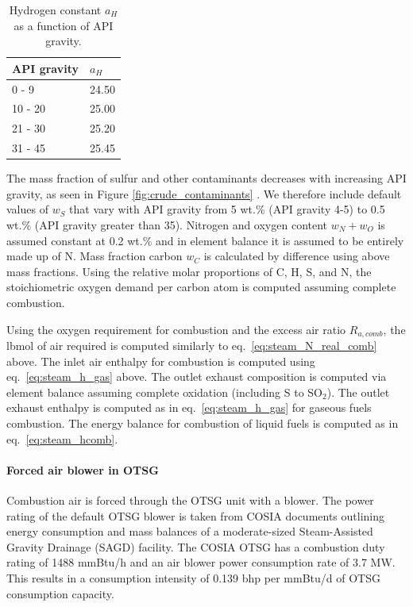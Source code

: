 \documentclass[11pt]{report}
\begin{document}
\begin{table}
\caption{Hydrogen constant $a_H$ as a function of API gravity.}
\label{tab:hydrogen_const}
\begin{scriptsize}
\begin{tabular*}{0.5\columnwidth}{p{}p{}}
\toprule
API gravity & $a_H$ \\
\midrule
0 - 9 & 24.50\\
10 - 20 & 25.00\\
21 - 30 & 25.20 \\
31 - 45 & 25.45 \\
\bottomrule
\end{tabular*}
\end{scriptsize}
\end{table}

The mass fraction of sulfur and other contaminants decreases with increasing API gravity, as seen in Figure \ref{fig:crude_contaminants} \cite[Ch. 8, tables 3, 4]{speight1994} \cite[Ch. 7, tables 2, 3, and 19]{speight1994} \cite{swafford2009}. We therefore include default values of $w_S$ that vary with API gravity from 5 wt.\% (API gravity 4-5) to 0.5 wt.\% (API gravity greater than 35). Nitrogen and oxygen content $w_N + w_O$ is assumed constant at 0.2 wt.\% and in element balance it is assumed to be entirely made up of N. Mass fraction carbon $w_C$ is calculated by difference using above mass fractions. Using the relative molar proportions of C, H, S, and N, the stoichiometric oxygen demand per carbon atom is computed assuming complete combustion. 

Using the oxygen requirement for combustion and the excess air ratio $R_{a,comb}$, the lbmol of air required is computed similarly to eq.\ \eqref{eq:steam_N_real_comb} above. The inlet air enthalpy for combustion is computed using eq.\ \eqref{eq:steam_h_gas} above. The outlet exhaust composition is computed via element balance assuming complete oxidation (including S to SO$_2$). The outlet exhaust enthalpy is computed as in eq.\ \eqref{eq:steam_h_gas} for gaseous fuels combustion. The energy balance for combustion of liquid fuels is computed as in eq.\ \eqref{eq:steam_hcomb}.

\paragraph{Forced air blower in OTSG}

Combustion air is forced through the OTSG unit with a blower. The power rating of the default OTSG blower is taken from COSIA documents outlining energy consumption and mass balances of a moderate-sized Steam-Assisted Gravity Drainage (SAGD) facility.  The COSIA OTSG has a combustion duty rating of 1488 mmBtu/h and an air blower power consumption rate of 3.7 MW.  This results in a consumption intensity of 0.139 bhp per mmBtu/d of OTSG consumption capacity.
\end{document}
